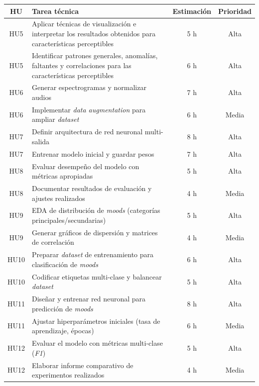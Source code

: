 \documentclass[
11pt, %
]{charter}
\begin{document}
\begin{table}[htpb]
\centering
\begin{tabularx}{\linewidth}{@{}|c|X|c|c|@{}}
\hline
\rowcolor[HTML]{C0C0C0}
HU & Tarea técnica & Estimación & Prioridad \\ \hline
HU5 & Aplicar técnicas de visualización e interpretar los resultados obtenidos para características perceptibles & 5 h & Alta \\ \hline
HU5 & Identificar patrones generales, anomalías, faltantes y correlaciones para las características perceptibles & 6 h & Alta \\ \hline

HU6 & Generar espectrogramas y normalizar audios & 7 h & Alta \\ \hline
HU6 & Implementar \textit{data augmentation} para ampliar \textit{dataset} & 6 h & Media \\ \hline

HU7 & Definir arquitectura de red neuronal multi-salida & 8 h & Alta \\ \hline
HU7 & Entrenar modelo inicial y guardar pesos & 7 h & Alta \\ \hline

HU8 & Evaluar desempeño del modelo con métricas apropiadas & 5 h & Alta \\ \hline
HU8 & Documentar resultados de evaluación y ajustes realizados & 4 h & Media \\ \hline

HU9 & EDA de distribución de \textit{moods} (categorías principales/secundarias) & 5 h & Alta \\ \hline
HU9 & Generar gráficos de dispersión y matrices de correlación & 4 h & Media \\ \hline

HU10 & Preparar \textit{dataset} de entrenamiento para clasificación de \textit{moods} & 6 h & Alta \\ \hline
HU10 & Codificar etiquetas multi-clase y balancear \textit{dataset} & 5 h & Alta \\ \hline

HU11 & Diseñar y entrenar red neuronal para predicción de \textit{moods} & 8 h & Alta \\ \hline
HU11 & Ajustar hiperparámetros iniciales (tasa de aprendizaje, épocas) & 6 h & Media \\ \hline

HU12 & Evaluar el modelo con métricas multi-clase (\textit{F1}) & 5 h & Alta \\ \hline
HU12 & Elaborar informe comparativo de experimentos realizados & 4 h & Media \\ \hline


\end{tabularx}
\end{table}
\end{document}

